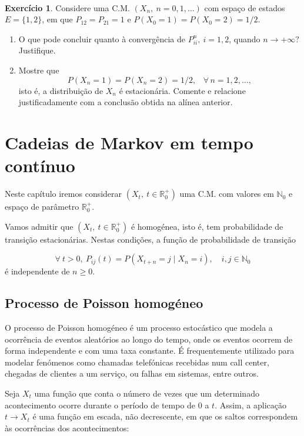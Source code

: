 \documentclass[
  11pt,
  a4paper,
]{book}
\theoremstyle{definition}
\theoremstyle{definition}
\theoremstyle{definition}
\newtheorem{exercise}{Exercício}[chapter]
\theoremstyle{definition}
\theoremstyle{remark}
\begin{document}
\(\,\)

\begin{exercise}
\leavevmode

Considere uma C.M. \((X_{n}, ~n=0,1,\dots)\) com espaço de estados \(E=\{1,2\}\), em que \(P_{12}=P_{21}=1\) e \(P(X_{0}=1)=P(X_{0}=2)=1/2\).

\begin{enumerate}
\def\labelenumi{(\alph{enumi})}
\item
  O que pode concluir quanto à convergência de \(P_{ii}^{n}, ~i=1,2\), quando \(n \to +\infty?\) Justifique.
\item
  Mostre que
  \[
  P(X_{n}=1)=P(X_{n}=2)=1/2,\;\;\;\forall \,n=1,2,\dots,
  \]
  isto é, a distribuição de \(X_{n}\) é estacionária. Comente e
  relacione justificadamente com a conclusão obtida na alínea
  anterior.
\end{enumerate}

\end{exercise}

\chapter{Cadeias de Markov em tempo contínuo}\label{cadeias-de-markov-em-tempo-continuo}

Neste capítulo iremos considerar \((X_t, ~ t \in \mathbb{R}_0^+)\) uma C.M. com valores em \(\mathbb{N}_0\) e espaço de parâmetro \(\mathbb{R}_0^+\).

Vamos admitir que \((X_t, ~ t \in \mathbb{R}_0^+)\) é homogénea, isto é, tem probabilidade de transição estacionárias. Nestas condições, a função de probabilidade de transição

\[\forall ~t >0, ~P_{ij}(t)=P(X_{t+n}=j \mid X_n=i), \quad i,j \in \mathbb{N}_0\]
é independente de \(n \geq 0\).

\section{Processo de Poisson homogéneo}\label{processo-de-poisson-homogeneo}

O processo de Poisson homogéneo é um processo estocástico que modela a ocorrência de eventos aleatórios ao longo do tempo, onde os eventos ocorrem de forma independente e com uma taxa constante. É frequentemente utilizado para modelar fenómenos como chamadas telefónicas recebidas num call center, chegadas de clientes a um serviço, ou falhas em sistemas, entre outros.

Seja \(X_t\) uma função que conta o número de vezes que um determinado acontecimento ocorre durante o período de tempo de 0 a \(t\). Assim, a aplicação \(t \longrightarrow X_t\) é uma função em escada, não decrescente, em que os saltos correspondem às ocorrências dos acontecimentos:
\end{document}
